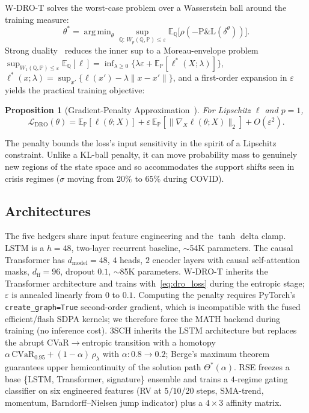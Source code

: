 \documentclass[11pt]{article}
\newcommand{\E}{\mathbb{E}}
\newcommand{\PP}{\mathbb{P}}
\newcommand{\QQ}{\mathbb{Q}}
\newcommand{\cvar}{\mathrm{CVaR}}
\newcommand{\Pnl}{\mathrm{P\&L}}
\DeclareMathOperator*{\argmin}{arg\,min}
\newtheorem{proposition}{Proposition}
\begin{document}
W-DRO-T solves the worst-case problem over a Wasserstein ball around the training measure:
\begin{equation}
\theta^* = \argmin_\theta \sup_{\QQ:\,W_p(\QQ,\PP)\le\varepsilon}
\E_\QQ\bigl[\rho(-\Pnl(\delta^\theta))\bigr].
\label{eq:dro_obj}
\end{equation}
Strong duality~\citep{blanchet2019quantifying} reduces the inner sup to a Moreau-envelope problem
\(
\sup_{W_1(\QQ,\PP)\le\varepsilon} \E_\QQ[\ell] =
\inf_{\lambda\ge0}\bigl\{\lambda\varepsilon + \E_\PP[\ell^*(X;\lambda)]\bigr\},
\)
$\ell^*(x;\lambda)=\sup_{x'}\{\ell(x')-\lambda\|x-x'\|\}$, and a first-order expansion in $\varepsilon$ yields the practical training objective:
\begin{proposition}[Gradient-Penalty Approximation~\citep{blanchet2019quantifying,esfahani2018data}]
\label{prop:wdro}
For Lipschitz $\ell$ and $p=1$,
\begin{equation}
\mathcal{L}_{\mathrm{DRO}}(\theta) = \E_\PP[\ell(\theta;X)] + \varepsilon\,\E_\PP[\|\nabla_X \ell(\theta;X)\|_2] + O(\varepsilon^2).
\label{eq:dro_loss}
\end{equation}
\end{proposition}
The penalty bounds the loss's input sensitivity in the spirit of a Lipschitz constraint.  Unlike a KL-ball penalty, it can move probability mass to genuinely new regions of the state space and so accommodates the support shifts seen in crisis regimes ($\sigma$ moving from $20\%$ to $65\%$ during COVID).

\subsection{Architectures}

The five hedgers share input feature engineering and the $\tanh$ delta clamp.  LSTM is a $h=48$, two-layer recurrent baseline, $\sim$54K parameters.  The causal Transformer has $d_{\text{model}}=48$, $4$ heads, $2$ encoder layers with causal self-attention masks, $d_{\text{ff}}=96$, dropout $0.1$, $\sim$85K parameters.  W-DRO-T inherits the Transformer architecture and trains with~\eqref{eq:dro_loss} during the entropic stage; $\varepsilon$ is annealed linearly from $0$ to $0.1$.  Computing the penalty requires PyTorch's \texttt{create\_graph=True} second-order gradient, which is incompatible with the fused efficient/flash SDPA kernels; we therefore force the MATH backend during training (no inference cost).  3SCH inherits the LSTM architecture but replaces the abrupt CVaR$\to$entropic transition with a homotopy $\alpha\,\cvar_{0.95}+(1-\alpha)\,\rho_\lambda$ with $\alpha:0.8\to0.2$; Berge's maximum theorem guarantees upper hemicontinuity of the solution path $\Theta^*(\alpha)$.  RSE freezes a base \{LSTM, Transformer, signature\} ensemble and trains a $4$-regime gating classifier on six engineered features (RV at $5/10/20$ steps, SMA-trend, momentum, Barndorff--Nielsen jump indicator) plus a $4{\times}3$ affinity matrix.
\end{document}
